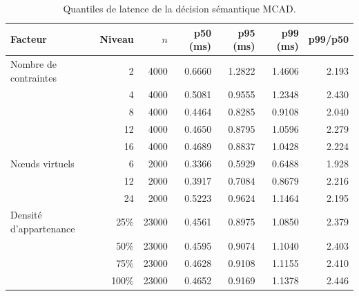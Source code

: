 \begin{table}[!t]
\centering
\caption{Quantiles de latence de la décision sémantique MCAD.}
\label{tab:latency}
\scriptsize
\begin{tabular}{@{}lrrrrrr@{}}
\toprule
Facteur & Niveau & $n$ & p50 (ms) & p95 (ms) & p99 (ms) & p99/p50 \\
\midrule
Nombre de contraintes & 2 & 4000 & 0.6660 & 1.2822 & 1.4606 & 2.193 \\
 & 4 & 4000 & 0.5081 & 0.9555 & 1.2348 & 2.430 \\
 & 8 & 4000 & 0.4464 & 0.8285 & 0.9108 & 2.040 \\
 & 12 & 4000 & 0.4650 & 0.8795 & 1.0596 & 2.279 \\
 & 16 & 4000 & 0.4689 & 0.8837 & 1.0428 & 2.224 \\
\addlinespace
Nœuds virtuels & 6 & 2000 & 0.3366 & 0.5929 & 0.6488 & 1.928 \\
 & 12 & 2000 & 0.3917 & 0.7084 & 0.8679 & 2.216 \\
 & 24 & 2000 & 0.5223 & 0.9624 & 1.1464 & 2.195 \\
\addlinespace
Densité d'appartenance & 25\% & 23000 & 0.4561 & 0.8975 & 1.0850 & 2.379 \\
 & 50\% & 23000 & 0.4595 & 0.9074 & 1.1040 & 2.403 \\
 & 75\% & 23000 & 0.4628 & 0.9108 & 1.1155 & 2.410 \\
 & 100\% & 23000 & 0.4652 & 0.9169 & 1.1378 & 2.446 \\
\bottomrule
\end{tabular}
\end{table}
